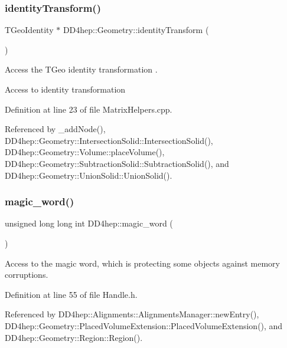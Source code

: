 \subsubsection{\texorpdfstring{identity\+Transform()}{identityTransform()}}
{\footnotesize\ttfamily T\+Geo\+Identity $\ast$ D\+D4hep\+::\+Geometry\+::identity\+Transform (\begin{DoxyParamCaption}{ }\end{DoxyParamCaption})}



Access the T\+Geo identity transformation . 

Access to identity transformation 

Definition at line 23 of file Matrix\+Helpers.\+cpp.



Referenced by \+\_\+add\+Node(), D\+D4hep\+::\+Geometry\+::\+Intersection\+Solid\+::\+Intersection\+Solid(), D\+D4hep\+::\+Geometry\+::\+Volume\+::place\+Volume(), D\+D4hep\+::\+Geometry\+::\+Subtraction\+Solid\+::\+Subtraction\+Solid(), and D\+D4hep\+::\+Geometry\+::\+Union\+Solid\+::\+Union\+Solid().

\hypertarget{group___d_d4_h_e_p___g_e_o_m_e_t_r_y_ga2410a636084da38b545f3774a04705be}{}\label{group___d_d4_h_e_p___g_e_o_m_e_t_r_y_ga2410a636084da38b545f3774a04705be} 
\subsubsection{\texorpdfstring{magic\+\_\+word()}{magic\_word()}}
{\footnotesize\ttfamily unsigned long long int D\+D4hep\+::magic\+\_\+word (\begin{DoxyParamCaption}{ }\end{DoxyParamCaption})\hspace{0.3cm}{\ttfamily [inline]}}



Access to the magic word, which is protecting some objects against memory corruptions. 



Definition at line 55 of file Handle.\+h.



Referenced by D\+D4hep\+::\+Alignments\+::\+Alignments\+Manager\+::new\+Entry(), D\+D4hep\+::\+Geometry\+::\+Placed\+Volume\+Extension\+::\+Placed\+Volume\+Extension(), and D\+D4hep\+::\+Geometry\+::\+Region\+::\+Region().


